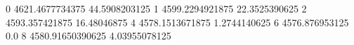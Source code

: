 0 4621.4677734375 44.5908203125
1 4599.2294921875 22.3525390625
2 4593.357421875 16.48046875
4 4578.1513671875 1.2744140625
6 4576.876953125 0.0
8 4580.91650390625 4.03955078125
